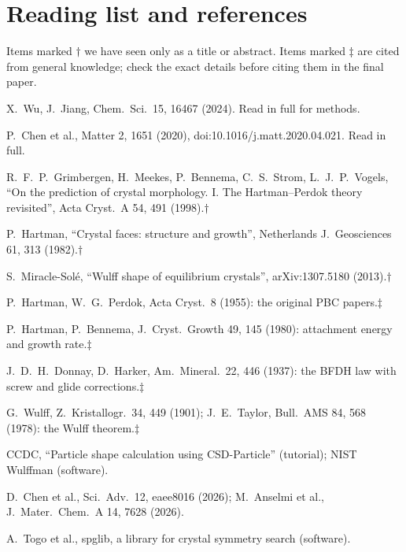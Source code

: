 \documentclass[11pt,a4paper]{article}
\theoremstyle{remark}\newtheorem*{example}{Worked example}
\begin{document}
\section{Reading list and references}
Items marked $\dagger$ we have seen only as a title or abstract. Items marked $\ddagger$ are cited from general knowledge; check the exact details before citing them in the final paper.
\begin{enumerate}[label={[\arabic*]}]
\item X.~Wu, J.~Jiang, Chem.\ Sci.\ 15, 16467 (2024). Read in full for methods.
\item P.~Chen et al., Matter 2, 1651 (2020), doi:10.1016/j.matt.2020.04.021. Read in full.
\item R.~F.~P.~Grimbergen, H.~Meekes, P.~Bennema, C.~S.~Strom, L.~J.~P.~Vogels, ``On the prediction of crystal morphology. I. The Hartman--Perdok theory revisited'', Acta Cryst.\ A 54, 491 (1998).$\dagger$
\item P.~Hartman, ``Crystal faces: structure and growth'', Netherlands J.\ Geosciences 61, 313 (1982).$\dagger$
\item S.~Miracle-Sol\'e, ``Wulff shape of equilibrium crystals'', arXiv:1307.5180 (2013).$\dagger$
\item P.~Hartman, W.~G.~Perdok, Acta Cryst.\ 8 (1955): the original PBC papers.$\ddagger$
\item P.~Hartman, P.~Bennema, J.\ Cryst.\ Growth 49, 145 (1980): attachment energy and growth rate.$\ddagger$
\item J.~D.~H.~Donnay, D.~Harker, Am.\ Mineral.\ 22, 446 (1937): the BFDH law with screw and glide corrections.$\ddagger$
\item G.~Wulff, Z.\ Kristallogr.\ 34, 449 (1901); J.~E.~Taylor, Bull.\ AMS 84, 568 (1978): the Wulff theorem.$\ddagger$
\item CCDC, ``Particle shape calculation using CSD-Particle'' (tutorial); NIST Wulffman (software).
\item D.~Chen et al., Sci.\ Adv.\ 12, eaee8016 (2026); M.~Anselmi et al., J.\ Mater.\ Chem.\ A 14, 7628 (2026).
\item A.~Togo et al., spglib, a library for crystal symmetry search (software).
\end{enumerate}
\end{document}
